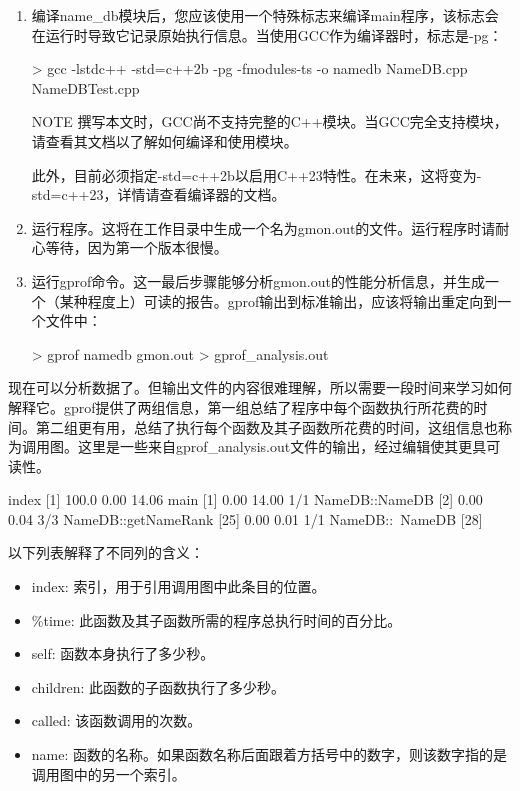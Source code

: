 \begin{enumerate}
\item
编译name\_db模块后，您应该使用一个特殊标志来编译main程序，该标志会在运行时导致它记录原始执行信息。当使用GCC作为编译器时，标志是-pg：

\begin{shell}
> gcc -lstdc++ -std=c++2b -pg -fmodules-ts -o namedb NameDB.cpp NameDBTest.cpp
\end{shell}

\begin{myNotic}{NOTE}
撰写本文时，GCC尚不支持完整的C++模块。当GCC完全支持模块，请查看其文档以了解如何编译和使用模块。

此外，目前必须指定-std=c++2b以启用C++23特性。在未来，这将变为-std=c++23，详情请查看编译器的文档。
\end{myNotic}

\item
运行程序。这将在工作目录中生成一个名为gmon.out的文件。运行程序时请耐心等待，因为第一个版本很慢。

\item
运行gprof命令。这一最后步骤能够分析gmon.out的性能分析信息，并生成一个（某种程度上）可读的报告。gprof输出到标准输出，应该将输出重定向到一个文件中：

\begin{shell}
> gprof namedb gmon.out > gprof_analysis.out
\end{shell}
\end{enumerate}

现在可以分析数据了。但输出文件的内容很难理解，所以需要一段时间来学习如何解释它。gprof提供了两组信息，第一组总结了程序中每个函数执行所花费的时间。第二组更有用，总结了执行每个函数及其子函数所花费的时间，这组信息也称为调用图。这里是一些来自gprof\_analysis.out文件的输出，经过编辑使其更具可读性。

\begin{shell}
index   %
[1]     100.0   0.00     14.06                main [1]
                0.00     14.00       1/1          NameDB::NameDB [2]
                0.00      0.04       3/3          NameDB::getNameRank [25]
                0.00      0.01       1/1          NameDB::~NameDB [28]
\end{shell}

以下列表解释了不同列的含义：

\begin{itemize}
\item
index: 索引，用于引用调用图中此条目的位置。

\item
\%time: 此函数及其子函数所需的程序总执行时间的百分比。

\item
self: 函数本身执行了多少秒。

\item
children: 此函数的子函数执行了多少秒。

\item
called: 该函数调用的次数。

\item
name: 函数的名称。如果函数名称后面跟着方括号中的数字，则该数字指的是调用图中的另一个索引。
\end{itemize}

